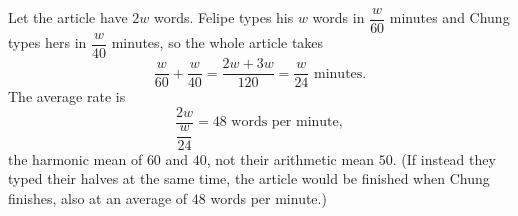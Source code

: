 Let the article have $2w$ words. Felipe types his $w$ words in $\dfrac{w}{60}$ minutes and Chung types hers in $\dfrac{w}{40}$ minutes, so the whole article takes
\[
\dfrac{w}{60}+\dfrac{w}{40}=\dfrac{2w+3w}{120}=\dfrac{w}{24}\text{ minutes}.
\]
The average rate is
\[
\dfrac{2w}{\dfrac{w}{24}}=\boxed{48\text{ words per minute}},
\]
the harmonic mean of $60$ and $40$, not their arithmetic mean $50$. (If instead they typed their halves at the same time, the article would be finished when Chung finishes, also at an average of $48$ words per minute.)
